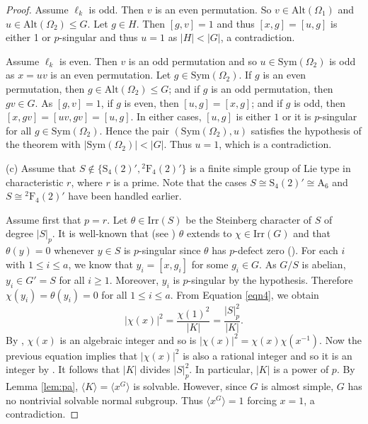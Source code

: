 \documentclass[twoside,a4paper,reqno,12pt]{amsart}
\newcommand{\<}{\langle}
\renewcommand{\>}{\rangle}
\newcommand{\la}{\langle}
\newcommand{\ra}{\rangle}
\newcommand{\leqs}{\leqslant}
\newcommand{\PSp}{\mathrm {S}}
\newcommand{\Irr}{\mathrm {Irr}}
\newcommand{\Alt}{\mathrm {Alt}}
\newcommand{\Sym}{\mathrm {Sym}}
\newcommand{\AAA}{\mathrm {A}}
\renewcommand{\leq}{\leqs}
\renewcommand{\:}{\colon}
\theoremstyle{definition}
\begin{document}
\begin{proof}
Assume $\ell_k$ is odd. Then $v$ is an even permutation. So $v\in\Alt(\Omega_1)$ and $u\in \Alt(\Omega_2)\leq G$. Let $g\in  H$. Then $[g,v]=1$ and thus $[x,g]=[u,g]$ is either 1 or $p$-singular and thus $u=1$ as $|H|<|G|$, a contradiction.

 Assume $\ell_k$ is even. Then $v$ is an odd permutation and so $u\in\Sym(\Omega_2)$ is odd as $x=uv$ is an even permutation.  Let $g\in\Sym(\Omega_2)$. If $g$ is an even permutation, then $g\in\Alt(\Omega_2)\leq G$; and if $g$ is an odd permutation, then $gv\in G$. As $[g,v]=1$, if $g$ is even, then $[u,g]=[x,g]$; and if $g$ is odd, then $[x,gv]=[uv,gv]=[u,g]$. In either cases, $[u,g]$ is either $1$ or it is $p$-singular for all $g\in \Sym(\Omega_2)$. Hence the pair $(\Sym(\Omega_2),u)$ satisfies the hypothesis of the theorem with $|\Sym(\Omega_2)|<|G|$. Thus $u=1$, which is a contradiction.

(c) Assume that $S\not\in\{\PSp_4(2)', {}^2\textrm{F}_4(2)'\}$ is a finite simple group of Lie type in characteristic $r$, where $r$ is a prime.  Note that the cases $S\cong \PSp_4(2)'\cong \AAA_6$  and $S\cong {}^2\textrm{F}_4(2)'$ have been handled earlier. 

Assume first that $p=r$. Let $\theta\in\Irr(S)$ be the Steinberg character of $S$ of degree $|S|_p$. It is well-known that (see \cite{F1}) $\theta$ extends to $\chi\in\Irr(G)$ and that $\theta(y)=0$ whenever $y\in S$ is $p$-singular since $\theta$ has $p$-defect zero (\cite[Theorem 8.17]{Isaacs-ct}). For each $i$ with $1\leq i\leq a$, we know that $y_i=[x,g_i]$ for some $g_i\in G$. As $G/S$ is abelian,  $y_i\in G'=S$ for all $i\ge 1$. Moreover, $y_i$ is $p$-singular by the hypothesis. Therefore $\chi(y_i)=\theta(y_i)=0$ for all $1\leq i\leq a$. From Equation \eqref{eqn4}, we obtain 
\begin{equation}\label{eqn5}
|\chi(x)|^2=\frac{\chi(1)^2}{|K|}=\frac{|S|_p^2}{|K|}.
\end{equation}
By \cite[Corollary 3.6]{Isaacs-ct}, $\chi(x)$ is an algebraic integer and so is $|\chi(x)|^2=\chi(x)\chi(x^{-1})$. Now the previous equation implies that $|\chi(x)|^2$ is also a rational integer and so it is an integer by \cite[Lemma 3.2]{Isaacs-ct}. It follows that $|K|$ divides $|S|_p^2$. In particular, $|K|$ is a power of $p$. By Lemma \ref{lem:pa}, $\la K\ra=\la x^G\ra$ is solvable. However, since $G$ is almost simple, $G$ has no nontrivial solvable normal subgroup. Thus $\la x^G\ra=1$ forcing $x=1$, a contradiction.



\end{proof}
\end{document}
